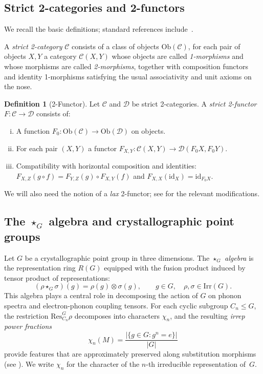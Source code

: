 \documentclass[12pt,a4paper]{article}
\theoremstyle{plain}
\theoremstyle{definition}
\newtheorem{definition}[theorem]{Definition}
\theoremstyle{remark}
\newcommand{\Ob}{\mathrm{Ob}}
\newcommand{\id}{\mathrm{id}}
\newcommand{\starG}{\star_G}
\newcommand{\chin}{\chi_n}
\begin{document}
\subsection{Strict 2-categories and 2-functors}\label{subsec:2cat}

We recall the basic definitions; standard references
include~\cite{placeholder_Benabou,placeholder_Lack,placeholder_Leinster}.

A \emph{strict 2-category} $\mathscr{C}$ consists of a class of objects
$\Ob(\mathscr{C})$, for each pair of objects $X, Y$ a category
$\mathscr{C}(X,Y)$ whose objects are called \emph{1-morphisms} and whose
morphisms are called \emph{2-morphisms}, together with composition functors
and identity 1-morphisms satisfying the usual associativity and unit axioms
on the nose.

\begin{definition}[2-Functor]\label{def:2-functor}
Let $\mathscr{C}$ and $\mathscr{D}$ be strict 2-categories.  A
\emph{strict 2-functor} $F \colon \mathscr{C} \to \mathscr{D}$ consists of:
\begin{enumerate}[(i)]
  \item A function $F_0 \colon \Ob(\mathscr{C}) \to \Ob(\mathscr{D})$ on
    objects.
  \item For each pair $(X,Y)$ a functor
    $F_{X,Y} \colon \mathscr{C}(X,Y) \to \mathscr{D}(F_0 X, F_0 Y)$.
  \item Compatibility with horizontal composition and identities:
    $F_{X,Z}(g \circ f) = F_{Y,Z}(g) \circ F_{X,Y}(f)$ and
    $F_{X,X}(\id_X) = \id_{F_0 X}$.
\end{enumerate}
\end{definition}

\noindent
We will also need the notion of a \emph{lax} 2-functor; see
 for the relevant modifications.

\subsection{The $\starG$ algebra and crystallographic point groups}
\label{subsec:starG}

Let $G$ be a crystallographic point group in three dimensions.  The
\emph{$\starG$ algebra} is the representation ring $R(G)$ equipped with the
fusion product induced by tensor product of representations:
\[
  (\rho \starG \sigma)(g) = \rho(g) \otimes \sigma(g), \qquad
  g \in G,\quad \rho, \sigma \in \mathrm{Irr}(G).
\]
This algebra plays a central role in decomposing the action of $G$ on phonon
spectra and electron-phonon coupling tensors.  For each cyclic subgroup
$C_n \leq G$, the restriction $\mathrm{Res}^G_{C_n} \rho$ decomposes into
characters $\chin$, and the resulting \emph{irrep power fractions}
\[
  \chin(M) = \frac{|\{g \in G : g^n = e\}|}{|G|}
\]
provide features that are approximately preserved along substitution
morphisms (see ).  We write $\chin$ for
the character of the $n$-th irreducible representation of~$G$.
\end{document}
